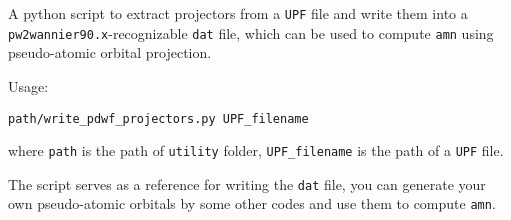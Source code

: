 A python script to extract projectors from a \verb#UPF# file
and write them into a \verb#pw2wannier90.x#-recognizable
\verb#dat# file, which can be used to compute \verb#amn# using pseudo-atomic orbital
projection.

Usage:\newline

\verb|path/write_pdwf_projectors.py UPF_filename|\newline

where \verb|path| is the path of \verb|utility| folder,
\verb|UPF_filename| is the path of a \verb#UPF# file.

The script serves as a reference for writing the \verb#dat# file,
you can generate your own pseudo-atomic orbitals by some other
codes and use them to compute \verb#amn#.
